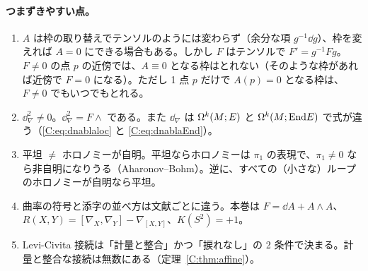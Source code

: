 \paragraph{つまずきやすい点。}
\begin{enumerate}
\item $A$ は枠の取り替えでテンソルのようには変わらず（余分な項 $g^{-1}\dd g$）、枠を変えれば $A=0$ にできる場合もある。しかし $F$ はテンソルで $F'=g^{-1}Fg$。$F\ne0$ の点 $p$ の近傍では、$A\equiv0$ となる枠はとれない（そのような枠があれば近傍で $F=0$ になる）。ただし 1 点 $p$ だけで $A(p)=0$ となる枠は、$F\ne0$ でもいつでもとれる。
\item $\dd_\nabla^2\ne0$。$\dd_\nabla^2=F\wedge$ である。また $\dd_\nabla$ は $\Omega^k(M;E)$ と $\Omega^k(M;\mathrm{End} E)$ で式が違う（\eqref{C:eq:dnablaloc} と \eqref{C:eq:dnablaEnd}）。
\item 平坦 $\ne$ ホロノミーが自明。平坦ならホロノミーは $\pi_1$ の表現で、$\pi_1\ne0$ なら非自明になりうる（Aharonov--Bohm）。逆に、すべての（小さな）ループのホロノミーが自明なら平坦。
\item 曲率の符号と添字の並べ方は文献ごとに違う。本巻は $F=\dd A+A\wedge A$、$R(X,Y)=[\nabla_X,\nabla_Y]-\nabla_{[X,Y]}$、$K(S^2)=+1$。
\item Levi-Civita 接続は「計量と整合」かつ「捩れなし」の 2 条件で決まる。計量と整合な接続は無数にある（定理~\ref{C:thm:affine}）。
\end{enumerate}

